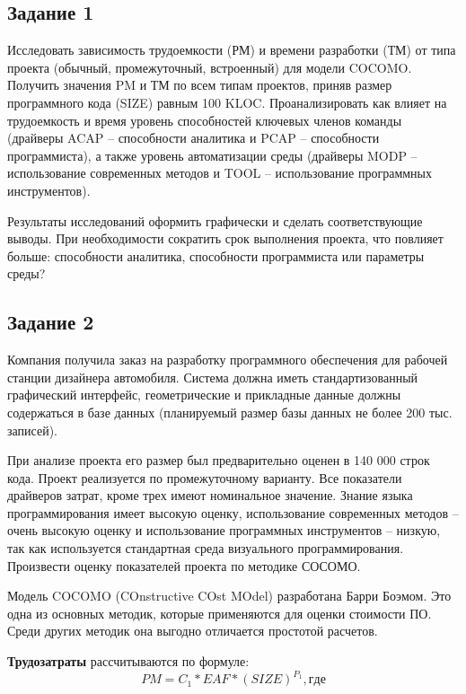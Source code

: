 \subsection*{Задание 1}
Исследовать зависимость трудоемкости (РМ) и времени разработки (ТМ) от типа проекта (обычный, промежуточный, встроенный) для модели COCOMO. 
Получить значения PM и ТМ по всем типам проектов, приняв размер программного кода (SIZE) равным 100 KLOC.
Проанализировать как влияет на трудоемкость и время уровень способностей ключевых членов команды (драйверы ACAP – способности аналитика и PCAP – способности программиста), а также уровень автоматизации среды (драйверы MODP – использование современных методов и TOOL – использование программных инструментов). 

Результаты исследований оформить графически и сделать соответствующие выводы. 
При необходимости сократить срок выполнения проекта, что повлияет больше: способности аналитика, способности программиста или параметры среды?

\subsection*{Задание 2}
Компания получила заказ на разработку программного обеспечения для рабочей станции дизайнера автомобиля. 
Система должна иметь стандартизованный графический интерфейс, геометрические и прикладные данные должны содержаться в базе
данных (планируемый размер базы данных не более 200 тыс. записей).

При анализе проекта его размер был предварительно оценен в 140 000 строк кода. 
Проект реализуется по промежуточному варианту. 
Все показатели драйверов затрат, кроме трех имеют номинальное значение.
Знание языка программирования имеет высокую оценку, использование современных методов – очень высокую оценку и использование программных инструментов – низкую, так как используется стандартная среда визуального программирования.
Произвести оценку показателей проекта по методике СОСОМО.

Модель COCOMO (COnstructive COst MOdel) разработана Барри Боэмом. 
Это одна из основных методик, которые применяются для оценки стоимости ПО. 
Среди других методик она выгодно отличается простотой расчетов.

\textbf{Трудозатраты} рассчитываются по формуле:
\begin{equation}
	PM = C_1 * EAF * (SIZE)^{P_1}, где
\end{equation}

